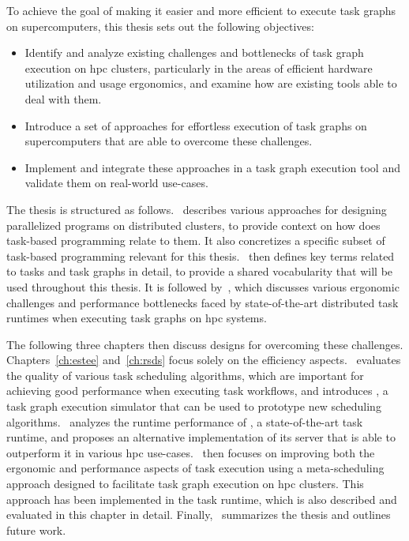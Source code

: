 To achieve the goal of making it easier and more efficient to execute task graphs on
supercomputers, this thesis sets out the following objectives:

\begin{itemize}
	\item Identify and analyze existing challenges and bottlenecks of task graph execution on
	      \gls{hpc} clusters, particularly in the areas of efficient hardware utilization and
	      usage ergonomics, and examine how are existing tools able to deal with them.
	\item Introduce a set of approaches for effortless execution of task graphs on supercomputers that are
	      able to overcome these challenges.
	\item Implement and integrate these approaches in a task graph execution tool and validate them on
	      real-world use-cases.
\end{itemize}

The thesis is structured as follows.~ describes various approaches for
designing parallelized programs on distributed clusters, to provide context on how does task-based
programming relate to them. It also concretizes a specific subset of task-based programming
relevant for this thesis.~ then defines key terms related to tasks and task
graphs in detail, to provide a shared vocabularity that will be used throughout this thesis. It is
followed by~, which discusses various ergonomic challenges and performance
bottlenecks faced by state-of-the-art distributed task runtimes when executing task graphs on
\gls{hpc} systems.

The following three chapters then discuss designs for overcoming these challenges.
Chapters~\ref{ch:estee} and~\ref{ch:rsds} focus solely on the efficiency
aspects.~ evaluates the quality of various task scheduling algorithms, which
are important for achieving good performance when executing task workflows, and introduces
\estee{}, a task graph execution simulator that can be used to prototype new
scheduling algorithms.~ analyzes the runtime performance of
\dask{}, a state-of-the-art task runtime, and proposes an alternative implementation
of its server that is able to outperform it in various \gls{hpc}
use-cases.~ then focuses on improving both the ergonomic and performance
aspects of task execution using a meta-scheduling approach designed to facilitate task graph
execution on \gls{hpc} clusters. This approach has been implemented in the
\hyperqueue{} task runtime, which is also described and evaluated in this chapter in
detail. Finally,~ summarizes the thesis and outlines future work.

